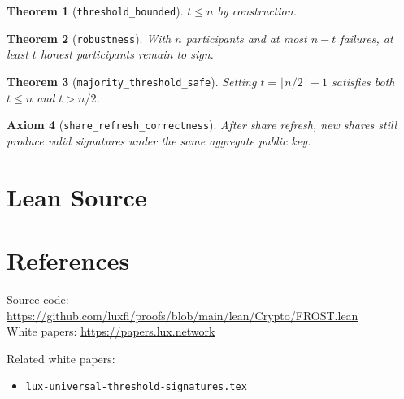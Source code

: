 \documentclass[11pt]{article}
\newtheorem{theorem}{Theorem}
\newtheorem{axiom_stmt}[theorem]{Axiom}
\begin{document}
\begin{theorem}[\texttt{threshold\_bounded}]
$t \leq n$ by construction.
\end{theorem}

\begin{theorem}[\texttt{robustness}]
With $n$ participants and at most $n-t$ failures, at least $t$ honest participants remain to sign.
\end{theorem}

\begin{theorem}[\texttt{majority\_threshold\_safe}]
Setting $t = \lfloor n/2 \rfloor + 1$ satisfies both $t \leq n$ and $t > n/2$.
\end{theorem}

\begin{axiom_stmt}[\texttt{share\_refresh\_correctness}]
After share refresh, new shares still produce valid signatures under the same aggregate public key.
\end{axiom_stmt}


\section{Lean Source}


\section{References}
\noindent Source code: \url{https://github.com/luxfi/proofs/blob/main/lean/Crypto/FROST.lean}\\
\noindent White papers: \url{https://papers.lux.network}

\noindent Related white papers:
\begin{itemize}
  \item \texttt{lux-universal-threshold-signatures.tex}
\end{itemize}
\end{document}
